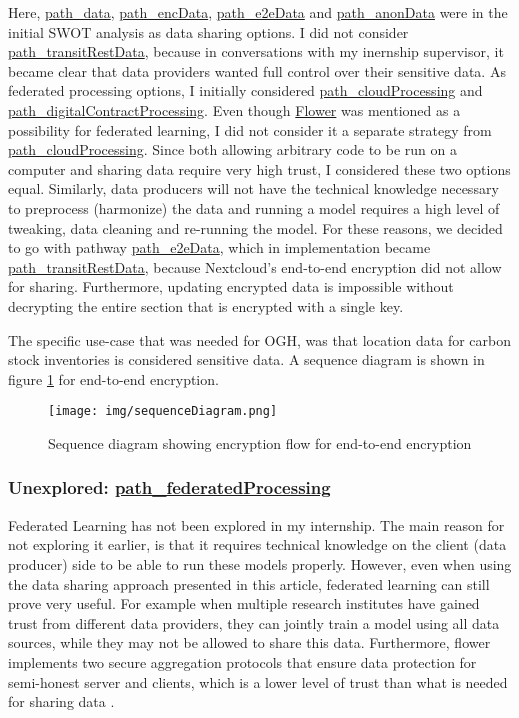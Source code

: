 \documentclass[journal, dvipsnames]{IEEEtran}
\newcommand{\descref}[1]{\hyperref[#1]{\csname#1\endcsname}}
\begin{document}
Here, \descref{path_data}, \descref{path_encData}, \descref{path_e2eData} and \descref{path_anonData} were in the initial SWOT analysis as data sharing options. I did not consider \descref{path_transitRestData}, because in conversations with my inernship supervisor, it became clear that data providers wanted full control over their sensitive data. As federated processing options, I initially considered \descref{path_cloudProcessing} and \descref{path_digitalContractProcessing}. Even though \href{https://flower.dev}{Flower} was mentioned as a possibility for federated learning, I did not consider it a separate strategy from \descref{path_cloudProcessing}. Since both allowing arbitrary code to be run on a computer and sharing data require very high trust, I considered these two options equal. Similarly, data producers will not have the technical knowledge necessary to preprocess (harmonize) the data and running a model requires a high level of tweaking, data cleaning and re-running the model. For these reasons, we decided to go with pathway \descref{path_e2eData}, which in implementation became \descref{path_transitRestData}, because Nextcloud's end-to-end encryption did not allow for sharing. Furthermore, updating encrypted data is impossible without decrypting the entire section that is encrypted with a single key.

The specific use-case that was needed for OGH, was that location data for carbon stock inventories is considered sensitive data. A sequence diagram is shown in figure \ref{fig_sequenceDiagram} for end-to-end encryption.

\begin{figure}
  \centering
  \texttt{[image: img/sequenceDiagram.png]}
  \caption{Sequence diagram showing encryption flow for end-to-end encryption}
  \label{fig_sequenceDiagram}
\end{figure}

\subsubsection{Unexplored: \texorpdfstring{\descref{path_federatedProcessing}}{Federated Processing}}

Federated Learning has not been explored in my internship. The main reason for not exploring it earlier, is that it requires technical knowledge on the client (data producer) side to be able to run these models properly. However, even when using the data sharing approach presented in this article, federated learning can still prove very useful. For example when multiple research institutes have gained trust from different data providers, they can jointly train a model using all data sources, while they may not be allowed to share this data. Furthermore, flower implements two secure aggregation protocols that ensure data protection for semi-honest server and clients, which is a lower level of trust than what is needed for sharing data \cite{bellSecureSingleServerAggregation2020, graserRoleSpatialData2022, mathurOndeviceFederatedLearning2021}.
\end{document}
